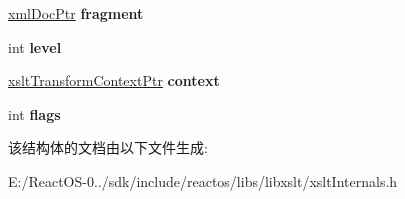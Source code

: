 \begin{DoxyCompactItemize}
\mbox{\label{struct__xslt_stack_elem_adbe8d0aa72691c6eb25023fd0932edfe}} 
\hyperlink{struct__xml_doc}{xml\+Doc\+Ptr} {\bfseries fragment}
\item 
\mbox{\label{struct__xslt_stack_elem_af302bd0542c32fb837ea2d0cc29c10eb}} 
int {\bfseries level}
\item 
\mbox{\label{struct__xslt_stack_elem_a7b176d83a69ad95c609fca4c6c5fd740}} 
\hyperlink{struct__xslt_transform_context}{xslt\+Transform\+Context\+Ptr} {\bfseries context}
\item 
\mbox{\label{struct__xslt_stack_elem_a98a751a5db2270e6fb7f9d034a63add9}} 
int {\bfseries flags}
\end{DoxyCompactItemize}


该结构体的文档由以下文件生成\+:\begin{DoxyCompactItemize}
\item 
E\+:/\+React\+O\+S-\/0../sdk/include/reactos/libs/libxslt/xslt\+Internals.\+h\end{DoxyCompactItemize}
